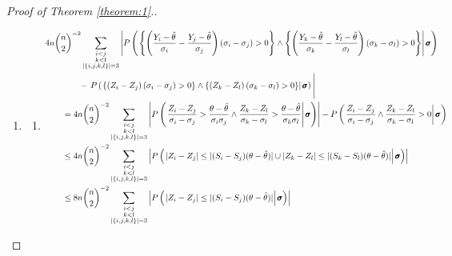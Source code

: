 \documentclass[12pt]{article}
\renewcommand{\P}{P}
\newcommand{\z}{Z}
\newcommand{\y}{Y}
\newcommand{\s}{S}
\begin{document}
\begin{proof}[Proof of Theorem \ref{theorem:1}.]
  \begin{enumerate}[wide, labelwidth=!, labelindent=0pt]
\item
  \begin{enumerate}[wide, labelwidth=!, labelindent=0pt]
  \item\label{theorem:1:step:1:a}

  \begin{align}
    &4n{n\choose 2}^{-2}\sum_{\substack{i<j\\k<l\\|\left\{i,j,k,l\right\}|=3}}\left|\P\left(\left.
    \left\{\left(\frac{\y_i-\hat\theta}{\sigma_i}-\frac{\y_j-\hat\theta}{\sigma_j}\right)(\sigma_i-\sigma_j)>0\right\}\wedge
      \left\{\left(\frac{\y_k-\hat\theta}{\sigma_k}-\frac{\y_l-\hat\theta}{\sigma_l}\right)(\sigma_k-\sigma_l)>0\right\}
    \right|\pmb{\sigma}\right)
    \right.\\&\qquad\qquad-\left.\P\left(\left.
    \left\{\left(\z_i-\z_j\right)(\sigma_i-\sigma_j)>0\right\}\wedge
      \left\{\left(\z_k-\z_l\right)(\sigma_k-\sigma_l)>0\right\}
    \right|\pmb{\sigma}\right)
    \vphantom{\frac{\y_l-\hat\theta}{\sigma_l}}\right|\\    
    &\qquad=4n{n\choose 2}^{-2}\sum_{\substack{i<j\\k<l\\|\left\{i,j,k,l\right\}|=3}}\left|\P\left(\left.
    \frac{\z_i-\z_j}{\sigma_i-\sigma_j}>\frac{\theta-\hat\theta}{\sigma_i\sigma_j}
    \wedge     \frac{\z_k-\z_l}{\sigma_k-\sigma_l}>\frac{\theta-\hat\theta}{\sigma_k\sigma_l}
    \right|\pmb{\sigma}\right)\right| -
    \P\left(\left.  \frac{\z_i-\z_j}{\sigma_i-\sigma_j}\wedge\frac{\z_k-\z_l}{\sigma_k-\sigma_l}>0\right|\pmb{\sigma}\right)\\
    &\qquad\le 4n{n\choose 2}^{-2}\sum_{\substack{i<j\\k<l\\|\left\{i,j,k,l\right\}|=3}}\left|\P\left(\left.
    |\z_i-\z_j|\le|(\s_i-\s_j)(\theta-\hat\theta)| \cup     |\z_k-\z_l|\le|(\s_k-\s_l)(\theta-\hat\theta)|
    \right|\pmb{\sigma}\right)\right|     \\
    &\qquad\le 8n{n\choose 2}^{-2}\sum_{\substack{i<j\\k<l\\|\left\{i,j,k,l\right\}|=3}}\left|\P\left(\left.
    |\z_i-\z_j|\le|(\s_i-\s_j)(\theta-\hat\theta)|
    \right|\pmb{\sigma}\right)\right|     \\

\end{align}
\end{enumerate}
\end{enumerate}
\end{proof}
\end{document}
